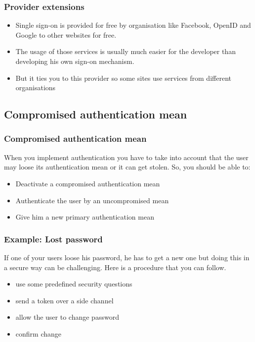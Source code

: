 \begin{frame}
\frametitle{Provider extensions}
\begin{itemize}
\item Single sign-on is provided for free by organisation like Facebook, OpenID and
Google to other websites for free.
\item The usage of those services is usually much easier for the
  developer than developing his own sign-on mechanism.
\item But it ties you to this provider so some sites use services from
  different organisations
\end{itemize}

\end{frame}

\subsection{Compromised authentication mean}

\begin{frame}
\frametitle{Compromised authentication mean}
 When you implement authentication you have to take into account that
 the user may loose its authentication mean or it can get stolen. So,
 you should be able to:

\begin{itemize}
\item Deactivate a compromised authentication mean
\item Authenticate the user by an uncompromised mean
\item Give him a new primary authentication mean
\end{itemize}

\end{frame}


\begin{frame}
\frametitle{Example: Lost password}
 If one of your users loose his password, he has to get a new one but
 doing this in a secure way can be challenging. Here is a procedure
 that you can follow.

\begin{itemize}
\item use some predefined security questions
\item send a token over a side channel
\item allow the user to change password
\item confirm change
\end{itemize}

\end{frame}
